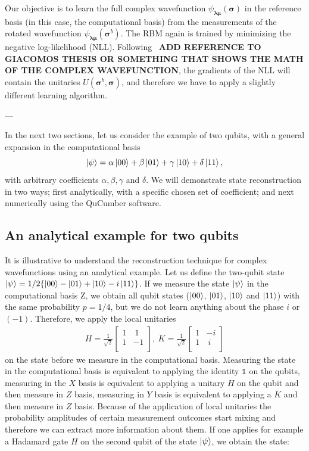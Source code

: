 \documentclass[submission, Phys]{SciPost}
\begin{document}
Our objective is to learn the full complex wavefunction $\psi_{\bm{\lambda} \bm{\mu}} (\bm{\sigma})$ in the reference basis (in this case, the computational basis) from the measurements of the rotated wavefunction $\psi_{\bm{\lambda} \bm{\mu}} (\bm{\sigma}^b)$.
The RBM again is trained by minimizing the negative log-likelihood (NLL). Following~\cite{} \textbf{ADD REFERENCE TO GIACOMOS THESIS OR SOMETHING THAT SHOWS THE MATH OF THE COMPLEX WAVEFUNCTION}, the gradients of the NLL will contain the unitaries $U (\bm{\sigma}^b, \bm{\sigma})$, and therefore we have to apply a slightly different learning algorithm.

---

In the next two sections, let us consider the example of two qubits, with a general expansion in the computational basis
\begin{equation}
\ket{\psi} = \alpha  \ket{00} + \beta  \ket{01} + \gamma  \ket{10} + \delta \ket{11},
\end{equation}
with arbitrary coefficients $\alpha, \beta, \gamma$ and $\delta$.  We will demonstrate state reconstruction in two ways; first analytically, with a specific chosen set of coefficient; and next numerically using the QuCumber software.

\subsection{An analytical example for two qubits}

It is illustrative to understand the reconstruction technique for complex wavefunctions using an analytical example.  Let us define
the two-qubit state
$\ket{\psi} = 1/2 \{ \ket{00} - \ket{01} + \ket{10} - i \ket{11} \}$.
If we measure the state $\ket{\psi}$ in the computational basis Z, we obtain all qubit states ($\ket{00}$, $\ket{01}$, $\ket{10}$ and $\ket{11}$) with the same probability $p = 1/4$, but we do not learn anything about the phase $i$ or $(-1)$.
Therefore, we apply the local unitaries
\begin{align}
	H = \frac{1}{\sqrt{2}}
	\begin{bmatrix}
		1 & ~1 \\
		1 & -1 \\
	\end{bmatrix},~
	K = \frac{1}{\sqrt{2}}
	\begin{bmatrix}
		1 & -i \\
		1 & ~i \\
	\end{bmatrix}  \label{Unitaries}
\end{align}
on the state before we measure in the computational basis. Measuring the state in the computational basis is equivalent to applying the identity $\mathds{1}$ on the qubits, measuring in the $X$ basis is equivalent to applying a unitary $H$ on the qubit and then measure in $Z$ basis, measuring in $Y$ basis is equivalent to applying a $K$ and then measure in $Z$ basis. Because of the application of local unitaries the probability amplitudes of certain measurement outcomes start mixing and therefore we can extract more information about them. If one applies for example a Hadamard gate $H$ on the second qubit of the state $\ket{\psi}$, we obtain the state:
\end{document}
